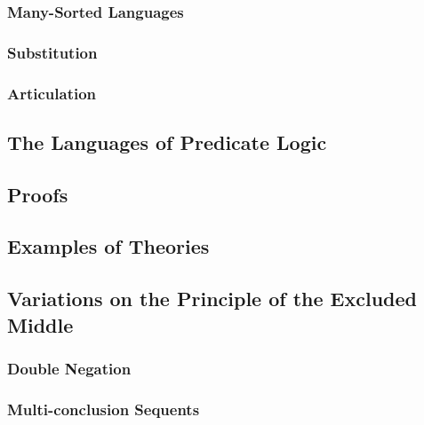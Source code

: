 \subsubsection{Many-Sorted Languages}
\subsubsection{Substitution}
\subsubsection{Articulation}


\subsection{The Languages of Predicate Logic}


\subsection{Proofs}


\subsection{Examples of Theories}


\subsection{Variations on the Principle of the Excluded Middle}
\subsubsection{Double Negation}
\subsubsection{Multi-conclusion Sequents}

\appendix







